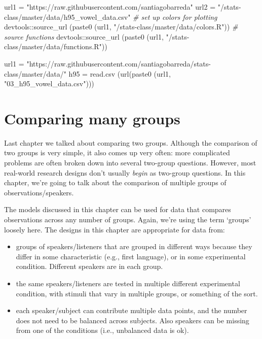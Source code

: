 \documentclass[
]{book}
\newenvironment{Shaded}{\begin{snugshade}}{\end{snugshade}}
\newcommand{\CommentTok}[1]{\textcolor[rgb]{0.56,0.35,0.01}{\textit{#1}}}
\newcommand{\FunctionTok}[1]{\textcolor[rgb]{0.00,0.00,0.00}{#1}}
\newcommand{\NormalTok}[1]{#1}
\newcommand{\OtherTok}[1]{\textcolor[rgb]{0.56,0.35,0.01}{#1}}
\newcommand{\SpecialCharTok}[1]{\textcolor[rgb]{0.00,0.00,0.00}{#1}}
\newcommand{\StringTok}[1]{\textcolor[rgb]{0.31,0.60,0.02}{#1}}
\begin{document}
\begin{Shaded}
\begin{Highlighting}[]
\NormalTok{url1 }\OtherTok{=} \StringTok{"https://raw.githubusercontent.com/santiagobarreda"}
\NormalTok{url2 }\OtherTok{=} \StringTok{"/stats{-}class/master/data/h95\_vowel\_data.csv"}
\CommentTok{\# set up colors for plotting}
\NormalTok{devtools}\SpecialCharTok{::}\FunctionTok{source\_url}\NormalTok{ (}\FunctionTok{paste0}\NormalTok{ (url1, }\StringTok{"/stats{-}class/master/data/colors.R"}\NormalTok{))}
\CommentTok{\# source functions}
\NormalTok{devtools}\SpecialCharTok{::}\FunctionTok{source\_url}\NormalTok{ (}\FunctionTok{paste0}\NormalTok{ (url1, }\StringTok{"/stats{-}class/master/data/functions.R"}\NormalTok{))}

\NormalTok{url1 }\OtherTok{=} \StringTok{"https://raw.githubusercontent.com/santiagobarreda/stats{-}class/master/data/"}
\NormalTok{h95 }\OtherTok{=} \FunctionTok{read.csv}\NormalTok{ (}\FunctionTok{url}\NormalTok{(}\FunctionTok{paste0}\NormalTok{ (url1, }\StringTok{"03\_h95\_vowel\_data.csv"}\NormalTok{)))}
\end{Highlighting}
\end{Shaded}

\hypertarget{comparing-many-groups}{%
\chapter{Comparing many groups}\label{comparing-many-groups}}

Last chapter we talked about comparing two groups. Although the comparison of two groups is very simple, it also comes up very often: more complicated problems are often broken down into several two-group questions. However, most real-world research designs don't usually \emph{begin} as two-group questions. In this chapter, we're going to talk about the comparison of multiple groups of observations/speakers.

The models discussed in this chapter can be used for data that compares observations across any number of groups. Again, we're using the term `groups' loosely here. The designs in this chapter are appropriate for data from:

\begin{itemize}
\item
  groups of speakers/listeners that are grouped in different ways because they differ in some characteristic (e.g., first language), or in some experimental condition. Different speakers are in each group.
\item
  the same speakers/listeners are tested in multiple different experimental condition, with stimuli that vary in multiple groups, or something of the sort.
\item
  each speaker/subject can contribute multiple data points, and the number does not need to be balanced across subjects. Also speakers can be missing from one of the conditions (i.e., unbalanced data is ok).
\end{itemize}
\end{document}
